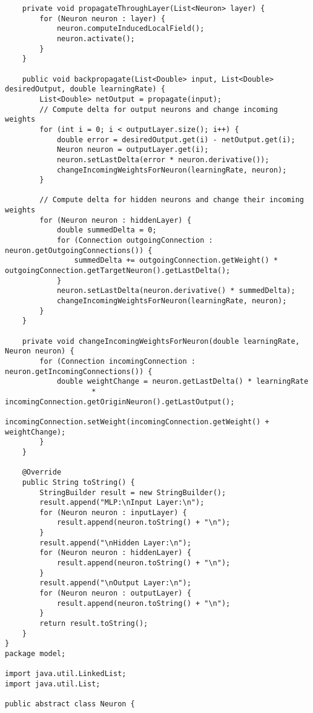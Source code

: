 \documentclass[paper=a4, fontsize=11pt]{scrartcl} %
\numberwithin{equation}{section} %
\numberwithin{figure}{section} %
\numberwithin{table}{section} %
\begin{document}
\begin{lstlisting}
    private void propagateThroughLayer(List<Neuron> layer) {
        for (Neuron neuron : layer) {
            neuron.computeInducedLocalField();
            neuron.activate();
        }
    }

    public void backpropagate(List<Double> input, List<Double> desiredOutput, double learningRate) {
        List<Double> netOutput = propagate(input);
        // Compute delta for output neurons and change incoming weights
        for (int i = 0; i < outputLayer.size(); i++) {
            double error = desiredOutput.get(i) - netOutput.get(i);
            Neuron neuron = outputLayer.get(i);
            neuron.setLastDelta(error * neuron.derivative());
            changeIncomingWeightsForNeuron(learningRate, neuron);
        }

        // Compute delta for hidden neurons and change their incoming weights
        for (Neuron neuron : hiddenLayer) {
            double summedDelta = 0;
            for (Connection outgoingConnection : neuron.getOutgoingConnections()) {
                summedDelta += outgoingConnection.getWeight() * outgoingConnection.getTargetNeuron().getLastDelta();
            }
            neuron.setLastDelta(neuron.derivative() * summedDelta);
            changeIncomingWeightsForNeuron(learningRate, neuron);
        }
    }

    private void changeIncomingWeightsForNeuron(double learningRate, Neuron neuron) {
        for (Connection incomingConnection : neuron.getIncomingConnections()) {
            double weightChange = neuron.getLastDelta() * learningRate
                    * incomingConnection.getOriginNeuron().getLastOutput();
            incomingConnection.setWeight(incomingConnection.getWeight() + weightChange);
        }
    }

    @Override
    public String toString() {
        StringBuilder result = new StringBuilder();
        result.append("MLP:\nInput Layer:\n");
        for (Neuron neuron : inputLayer) {
            result.append(neuron.toString() + "\n");
        }
        result.append("\nHidden Layer:\n");
        for (Neuron neuron : hiddenLayer) {
            result.append(neuron.toString() + "\n");
        }
        result.append("\nOutput Layer:\n");
        for (Neuron neuron : outputLayer) {
            result.append(neuron.toString() + "\n");
        }
        return result.toString();
    }
}
package model;

import java.util.LinkedList;
import java.util.List;

public abstract class Neuron {


\end{lstlisting}
\end{document}
